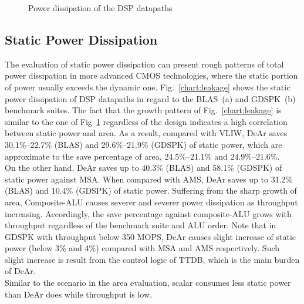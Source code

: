 {    \vspace{\textfig}
    \begin{figure}[!ht]
        \begin{center}
        \end{center}
        \caption{Power dissipation of the DSP datapaths}
        \label{chart:area}
    \end{figure}
    \subsection{Static Power Dissipation}
    The evaluation of static power dissipation can present rough patterns of total power dissipation in more advanced CMOS technologies, 
    where the static portion of power usually exceeds the dynamic one.
    Fig.~\ref{chart:leakage} shows the static power dissipation of DSP datapaths in regard to the BLAS~(a) and GDSPK~(b) benchmark suites.
    The fact that the growth pattern of Fig.~\ref{chart:leakage} is similar to the one of Fig~\ref{chart:area} regardless of the design indicates a high correlation between static power and area.
    As a result, compared with VLIW, DeAr saves 30.1\%--22.7\% (BLAS) and 29.6\%--21.9\% (GDSPK) of static power, 
    which are approximate to the save percentage of area, 24.5\%--21.1\% and 24.9\%--21.6\%.
    \\\indent 
    On the other hand, DeAr saves up to 40.3\% (BLAS) and 58.1\% (GDSPK) of static power against MSA.
    When compared with AMS, DeAr saves up to 31.2\% (BLAS) and 10.4\% (GDSPK) of static power.
    Suffering from the sharp growth of area, 
    Composite-ALU causes severer and severer power dissipation as throughput increasing.
    Accordingly, the save percentage against composite-ALU grows with throughput regardless of the benchmark suite and ALU order.
    Note that in GDSPK with throughput below 350 MOPS, 
    DeAr causes slight increase of static power (below 3\% and 4\%) compared with MSA and AMS respectively.
    Such slight increase is result from the control logic of TTDB, 
    which is the main burden of DeAr.
    \\\indent 
    Similar to the scenario in the area evaluation, 
    scalar consumes less static power than DeAr does while throughput is low.
}
